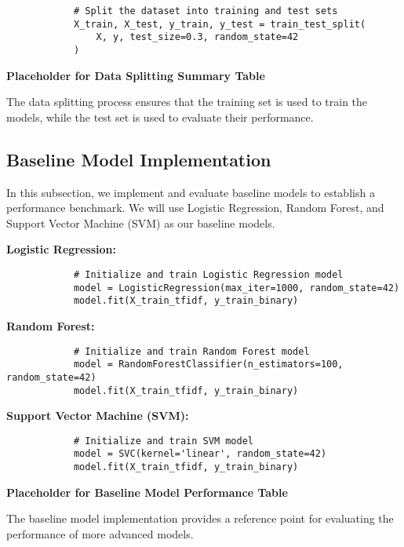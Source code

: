         \begin{verbatim}
            # Split the dataset into training and test sets
            X_train, X_test, y_train, y_test = train_test_split(
                X, y, test_size=0.3, random_state=42
            )
        \end{verbatim}

        \textbf{Placeholder for Data Splitting Summary Table}

        The data splitting process ensures that the training set is used to train the models, while the test set is used to evaluate their performance.
            
    \subsection{Baseline Model Implementation}
    
        In this subsection, we implement and evaluate baseline models to establish a performance benchmark. We will use Logistic Regression, Random Forest, and Support Vector Machine (SVM) as our baseline models.

        \textbf{Logistic Regression:}

        \begin{verbatim}
            # Initialize and train Logistic Regression model
            model = LogisticRegression(max_iter=1000, random_state=42)
            model.fit(X_train_tfidf, y_train_binary)
        \end{verbatim}

        \textbf{Random Forest:}

        \begin{verbatim}
            # Initialize and train Random Forest model
            model = RandomForestClassifier(n_estimators=100, random_state=42)
            model.fit(X_train_tfidf, y_train_binary)
        \end{verbatim}

        \textbf{Support Vector Machine (SVM):}

        \begin{verbatim}
            # Initialize and train SVM model
            model = SVC(kernel='linear', random_state=42)
            model.fit(X_train_tfidf, y_train_binary)
        \end{verbatim}

        \textbf{Placeholder for Baseline Model Performance Table}

        The baseline model implementation provides a reference point for evaluating the performance of more advanced models.
            
